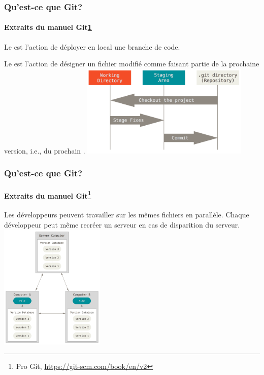 \documentclass{beamer}
\begin{document}
    \begin{frame}
        \frametitle{Qu'est-ce que Git?}
        \framesubtitle{Extraits du manuel Git\cref{progit}}
        \transdissolve
        Le  est l'action de déployer en local une branche de code.

        Le  est l'action de désigner un fichier modifié comme faisant partie de la prochaine version, i.e., du prochain .
        \bigbreak
        \centering
        \includegraphics[width=8cm]{image/git-local-areas.png}
    \end{frame}

    \begin{frame}
        \frametitle{Qu'est-ce que Git?}
        \framesubtitle{Extraits du manuel Git\footnote{\label{progit}Pro Git, \url{https://git-scm.com/book/en/v2}}}
        \transdissolve
        Les développeurs peuvent travailler sur les mêmes fichiers en parallèle.
        Chaque développeur peut même recréer un serveur en cas de disparition du serveur.
        \bigbreak
        \centering
        \includegraphics[width=5cm]{image/dvcs-scheme.png}
    \end{frame}
\end{document}

